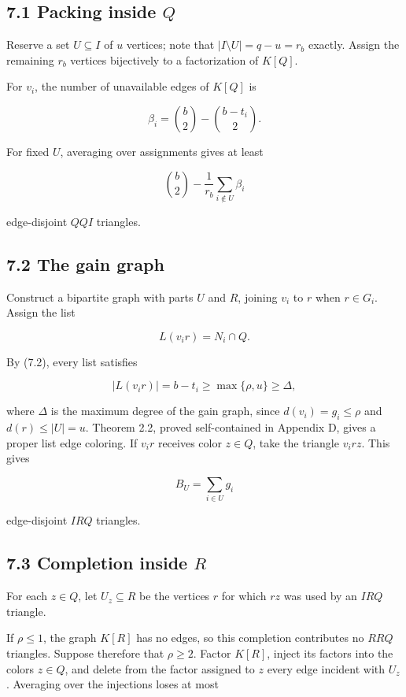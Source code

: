 \documentclass[
  11pt,
]{article}
\begin{document}
\subsection{\texorpdfstring{7.1 Packing inside
\(Q\)}{7.1 Packing inside Q}}\label{packing-inside-q}

Reserve a set \(U\subseteq I\) of \(u\) vertices; note that
\(|I\setminus U|=q-u=r_b\) exactly. Assign the remaining \(r_b\)
vertices bijectively to a factorization of \(K[Q]\).

For \(v_i\), the number of unavailable edges of \(K[Q]\) is

\[
\beta_i
=
\binom b2-\binom{b-t_i}{2}.
\tag{7.4}
\]

For fixed \(U\), averaging over assignments gives at least

\[
\binom b2-\frac1{r_b}\sum_{i\notin U}\beta_i
\tag{7.5}
\]

edge-disjoint \(QQI\) triangles.

\subsection{7.2 The gain graph}\label{the-gain-graph}

Construct a bipartite graph with parts \(U\) and \(R\), joining \(v_i\)
to \(r\) when \(r\in G_i\). Assign the list

\[
L(v_ir)=N_i\cap Q.
\]

By (7.2), every list satisfies

\[
|L(v_ir)|=b-t_i
\ge
\max\{\rho,u\}
\ge
\Delta,
\]

where \(\Delta\) is the maximum degree of the gain graph, since
\(d(v_i)=g_i\le\rho\) and \(d(r)\le|U|=u\). Theorem 2.2, proved
self-contained in Appendix D, gives a proper list edge coloring. If
\(v_ir\) receives color \(z\in Q\), take the triangle \(v_irz\). This
gives

\[
B_U=\sum_{i\in U}g_i
\]

edge-disjoint \(IRQ\) triangles.

\subsection{\texorpdfstring{7.3 Completion inside
\(R\)}{7.3 Completion inside R}}\label{completion-inside-r}

For each \(z\in Q\), let \(U_z\subseteq R\) be the vertices \(r\) for
which \(rz\) was used by an \(IRQ\) triangle.

If \(\rho\le1\), the graph \(K[R]\) has no edges, so this completion
contributes no \(RRQ\) triangles. Suppose therefore that \(\rho\ge2\).
Factor \(K[R]\), inject its factors into the colors \(z\in Q\), and
delete from the factor assigned to \(z\) every edge incident with
\(U_z\). Averaging over the injections loses at most
\end{document}
